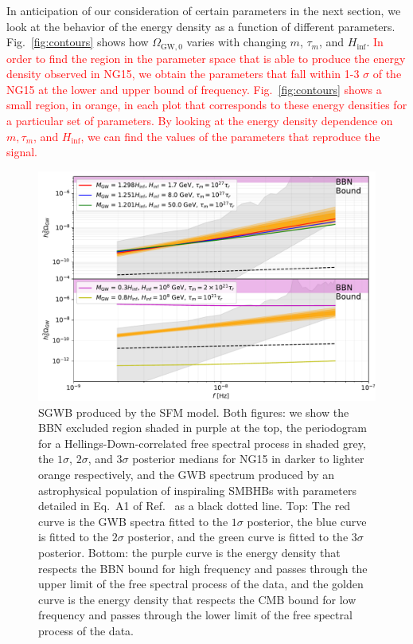 \documentclass[prd,twocolumn,aps,psfig,nofootinbib,nobibnotes,superscriptaddress,preprintnumbers,times]{revtex4-2}
\def\red{\textcolor{red}}
\begin{document}
In anticipation of our consideration of certain parameters in the next section, we look at the behavior of the energy density as a function of different parameters. Fig.\ \ref{fig:contours} shows how $\Omega_{\text{GW},0}$ varies with changing $m$, $\tau_m$, and $H_{\inf}$. \red{In order to find the region in the parameter space that is able to produce the energy density observed in NG15, we obtain the parameters that fall within 1-3 $\sigma$ of the NG15 at the lower and upper bound of frequency. Fig.\ \ref{fig:contours} shows a small region, in orange, in each plot that corresponds to these energy densities for a particular set of parameters. By looking at the energy density dependence on $m, \tau_m$, and $H_{\inf}$, we can find the values of the parameters that reproduce the signal.}

\begin{figure}
\includegraphics[width=\textwidth]{fig3.pdf} 
\caption{SGWB produced by the SFM model. Both figures: we show the BBN excluded region shaded in purple at the top, the periodogram for a Hellings-Down-correlated free spectral process \cite{Agazie:2023} in shaded grey, the $1\sigma$, $2\sigma$, and $3\sigma$ posterior medians for NG15 \cite{Agazie:2023} in darker to lighter orange respectively, and the GWB spectrum produced by an astrophysical population of inspiraling SMBHBs with parameters detailed in Eq.\ A1 of Ref.\ \cite{Afzal:2023} as a black dotted line. Top: The red curve is the GWB spectra fitted to the $1\sigma$ posterior, the blue curve is fitted to the $2\sigma$ posterior, and the green curve is fitted to the $3\sigma$ posterior. Bottom: the purple curve is the energy density that respects the BBN bound for high frequency and passes through the upper limit of the free spectral process of the data, and the golden curve is the energy density that respects the CMB bound for low frequency and passes through the lower limit of the free spectral process of the data.} 
\label{fig:GWB}
\end{figure}
\end{document}
